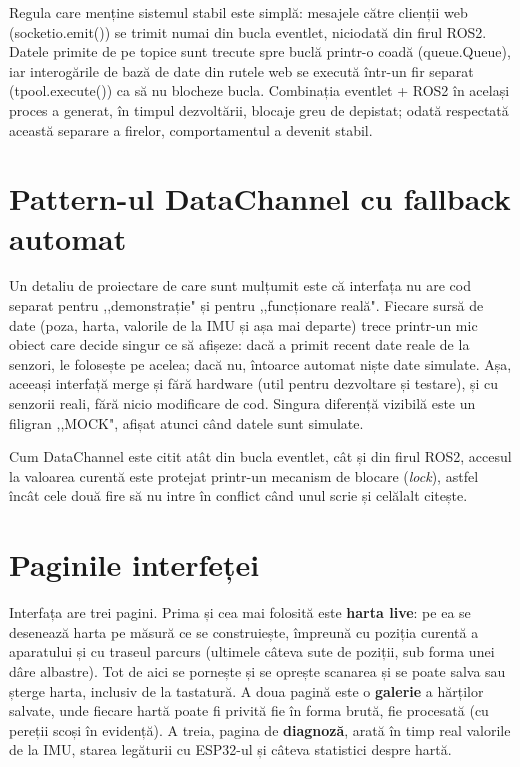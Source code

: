 \documentclass[a4paper,12pt,twoside,openany]{report}
\renewcommand{\texttt}[1]{\textnormal{#1}}
\begin{document}
Regula care menține sistemul stabil este simplă: mesajele către clienții web
(\texttt{socketio.emit()}) se trimit numai din bucla eventlet, niciodată din
firul ROS2. Datele primite de pe topice sunt trecute spre buclă printr-o coadă
(\texttt{queue.Queue}), iar interogările de bază de date din rutele web se
execută într-un fir separat (\texttt{tpool.execute()}) ca să nu blocheze bucla.
Combinația eventlet + ROS2 în același proces a generat, în timpul dezvoltării,
blocaje greu de depistat; odată respectată această separare a firelor,
comportamentul a devenit stabil.

\section{Pattern-ul DataChannel cu fallback automat}
\label{sec:datachannel}

Un detaliu de proiectare de care sunt mulțumit este că interfața nu are cod
separat pentru ,,demonstrație" și pentru ,,funcționare reală". Fiecare sursă de
date (poza, harta, valorile de la IMU și așa mai departe) trece printr-un mic
obiect care decide singur ce să afișeze: dacă a primit recent date reale de la
senzori, le folosește pe acelea; dacă nu, întoarce automat niște date simulate.
Așa, aceeași interfață merge și fără hardware (util pentru dezvoltare și
testare), și cu senzorii reali, fără nicio modificare de cod. Singura diferență
vizibilă este un filigran ,,MOCK", afișat atunci când datele sunt simulate.

Cum \texttt{DataChannel} este citit atât din bucla eventlet, cât și din firul
ROS2, accesul la valoarea curentă este protejat printr-un mecanism de blocare
(\textit{lock}), astfel încât cele două fire să nu intre în conflict când unul
scrie și celălalt citește.

\section{Paginile interfeței}
\label{sec:pages}

Interfața are trei pagini. Prima și cea mai folosită este \textbf{harta live}:
pe ea se desenează harta pe măsură ce se construiește, împreună cu poziția
curentă a aparatului și cu traseul parcurs (ultimele câteva sute de poziții,
sub forma unei dâre albastre). Tot de aici se pornește și se oprește scanarea
și se poate salva sau șterge harta, inclusiv de la tastatură. A doua pagină
este o \textbf{galerie} a hărților salvate, unde fiecare hartă poate fi privită
fie în forma brută, fie procesată (cu pereții scoși în evidență). A treia,
pagina de \textbf{diagnoză}, arată în timp real valorile de la IMU, starea
legăturii cu ESP32-ul și câteva statistici despre hartă.
\end{document}
